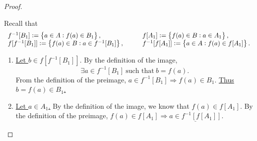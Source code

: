 \documentclass[11pt,openany]{article}
\begin{document}
\begin{proof}
\textcolor{gray!30!white}{
	Recall that \[\begin{array}{ll}
		f^{-1}[B_1]:=\set{a\in A:f(a)\in B_1}, &\quad\quad f[A_1]:=\set{f(a)\in B:a\in A_1}, \\
		f[f^{-1}[B_1]]:=\set{f(a)\in B:a \in f^{-1}[B_1]}, &\quad\quad f^{-1}[f[A_1]]:=\set{a\in A:f(a)\in f[A_1]}.
	\end{array}\]\begin{enumerate}[(1)]
		\item \underline{Let $b \in f[f^{-1}[B_1]]$}. By the definition of the image, \[
		\exists a\in f^{-1}[B_1]\ \text{such that}\ b = f(a).
		\] From the definition of the preimage, $a\in f^{-1}[B_1]\Rightarrow f(a)\in B_1$. \underline{Thus $b=f(a)\in B_1$.}
		\vspace{12pt}
		\item \underline{Let $a\in A_1$.} By the definition of the image, we know that $f(a)\in f[A_1]$. By the definition of the preimage, $f(a)\in f[A_1]\Rightarrow \underline{a\in f^{-1}[f[A_1]]}$.
	\end{enumerate}}
\end{proof}
\end{document}
